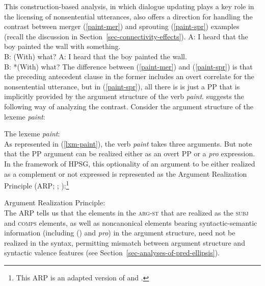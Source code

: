This construction-based analysis, in which dialogue updating plays
a key role in the licensing of nonsentential utterances, also offers a direction
for handling the contrast between merger (\ref{paint-mer}) and sprouting (\ref{paint-spr}) examples (recall the discussion in Section~\ref{sec-connectivity-effects}). %
%
\eal
\ex A: I heard that the boy painted the wall with something.\\
    B: (With) what?  
\label{paint-mer}
\ex A: I heard that the boy painted the wall.\\
    B: *(With) what? \label{paint-spr}
\zl
%
The difference between (\ref{paint-mer}) and (\ref{paint-spr})  is that the preceding antecedent clause in the
former includes an overt correlate for the nonsentential utterance, but in (\ref{paint-spr}), 
all there is is just a PP that is implicitly provided
by the argument structure 
of the verb \textit{paint}.
%
\citet{Kim2015} suggests the following way of analyzing the contrast. Consider the argument structure of the lexeme \textit{paint}:

\ea
\label{lxm-paint}
The lexeme \textit{paint}:\\
\z
%
%
As represented in (\ref{lxm-paint}), the verb \emph{paint}
takes three arguments. But
note that the PP argument can be realized
either as an overt PP or a \textit{pro} expression. In the framework of HPSG, this optionality of an
argument to be either realized as a complement or not expressed is represented as the Argument
Realization Principle  (ARP; \citealt[]{ginzburg-miller-ellipsis-handbook}; \crossrefchapteralt[\page \pageref{page-argument-realization-principle}]{properties}):\footnote{This ARP is an adapted version of \citet[171]{Ginzburg:Sag:2000} and \citet[11]{Bouma:Malouf:Sag:01}.}
%

\ea
\label{arp}
Argument Realization Principle:\\
 \impl
{}
\z
The ARP tells us that the elements in the \textsc{arg-st} that are realized as the \textsc{subj} and
\textsc{comps} elements, as well as noncanonical elements bearing syntactic-semantic information (including  () and \textit{pro}) in the argument structure, need not be realized in the syntax, permitting mismatch between argument structure and syntactic valence features (see Section~\ref{sec-analyses-of-pred-ellipsis}). 

